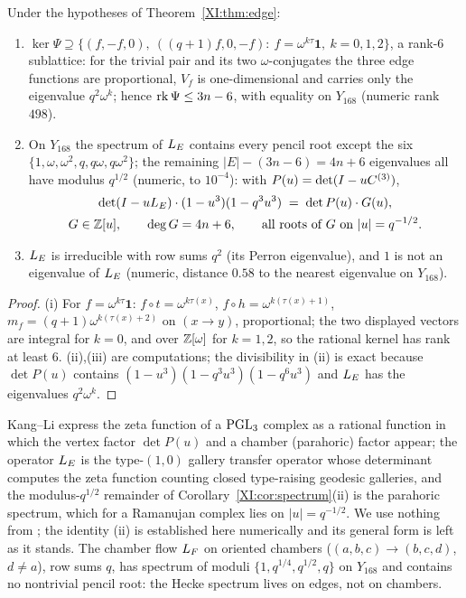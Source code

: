 \begin{corollary}\label{XI:cor:spectrum}
Under the hypotheses of Theorem~\ref{XI:thm:edge}:
\begin{enumerate}
\item[(i)] $\ker\Psi\supseteq\{(f,-f,0),\ ((q+1)f,0,-f):\ f=\omega^{k\tau}\mathbf1,\ k=0,1,2\}$,
a rank-$6$ sublattice: for the trivial pair and its two $\omega$-conjugates the three edge
functions are proportional, $V_f$ is one-dimensional and carries only the eigenvalue
$q^{2}\omega^{k}$; hence $\operatorname{rk}\Psi\le3n-6$, with equality on $Y_{168}$ (numeric rank $498$).
\item[(ii)] On $Y_{168}$ the spectrum of $L_E$ contains every pencil root except the six
$\{1,\omega,\omega^{2},q,q\omega,q\omega^{2}\}$; the remaining $|E|-(3n-6)=4n+6$ eigenvalues
all have modulus $q^{1/2}$ (numeric, to $10^{-4}$): with $P(u)=\det(I-uC^{(3)})$,
\begin{gather*}
\det(I-uL_E)\cdot(1-u^{3})(1-q^{3}u^{3})\;=\;\det P(u)\cdot G(u),\\
G\in\mathbb{Z}[u],\qquad \deg G=4n+6,\qquad \text{all roots of $G$ on }|u|=q^{-1/2}.
\end{gather*}
\item[(iii)] $L_E$ is irreducible with row sums $q^{2}$ (its Perron eigenvalue), and $1$ is
not an eigenvalue of $L_E$ (numeric, distance $0.58$ to the nearest eigenvalue on $Y_{168}$).
\end{enumerate}
\end{corollary}

\begin{proof}
(i) For $f=\omega^{k\tau}\mathbf1$: $f\circ t=\omega^{k\tau(x)}$, $f\circ h=\omega^{k(\tau(x)+1)}$,
$m_f=(q+1)\omega^{k(\tau(x)+2)}$ on $(x\to y)$, proportional; the two displayed vectors are
integral for $k=0$, and over $\mathbb{Z}[\omega]$ for $k=1,2$, so the rational kernel has rank at
least $6$. (ii),(iii) are computations; the divisibility in (ii) is exact because
$\det P(u)$ contains $(1-u^{3})(1-q^{3}u^{3})(1-q^{6}u^{3})$ and $L_E$ has the eigenvalues
$q^{2}\omega^{k}$.
\end{proof}

\begin{remark}\label{XI:rem:KL}
Kang--Li \cite{KL} express the zeta function of a $\mathrm{PGL}_3$ complex as a rational function
in which the vertex factor $\det P(u)$ and a chamber (parahoric) factor appear; the operator
$L_E$ is the type-$(1,0)$ gallery transfer operator whose determinant computes the zeta
function counting closed type-raising geodesic galleries, and the modulus-$q^{1/2}$
remainder of Corollary~\ref{XI:cor:spectrum}(ii) is the parahoric spectrum, which for a
Ramanujan complex lies on $|u|=q^{-1/2}$. We use nothing from \cite{KL}; the identity (ii)
is established here numerically and its general form is left as it stands. The chamber
flow $L_{F}$ on oriented chambers ($(a,b,c)\to(b,c,d)$, $d\ne a$), row sums $q$, has spectrum
of moduli $\{1,q^{1/4},q^{1/2},q\}$ on $Y_{168}$ and contains no nontrivial pencil root: the
Hecke spectrum lives on edges, not on chambers.
\end{remark}

